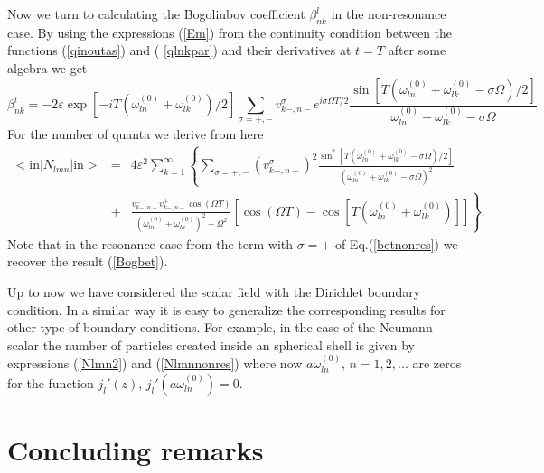 \documentclass[a4paper,11pt]{article}
\begin{document}
Now we turn to calculating the Bogoliubov coefficient $\beta
^{l}_{nk}$ in the non-resonance case. By using the expressions
(\ref{Em})
from the continuity condition between the functions (\ref{qinoutas}) and (%
\ref{qlnkpar}) and their derivatives at $t=T$ after some algebra we get
\begin{equation}
\beta _{nk}^{l} =-2\varepsilon \exp \left[ -iT\left( \omega
_{ln}^{(0)}+\omega _{lk}^{(0)}\right) /2\right] \sum_{\sigma =+,-}
v_{k-,n-}^{\sigma }e^{i\sigma \Omega T/2}\frac{\sin \left[ T\left( \omega
_{ln}^{(0)}+\omega _{lk}^{(0)}-\sigma \Omega \right) /2\right] }{\omega
_{ln}^{(0)}+\omega _{lk}^{(0)}-\sigma \Omega }   \label{betnonres}
\end{equation}
For the number of quanta we derive from here
\begin{eqnarray}
<{\mathrm{in}}|N_{lmn}|{\mathrm{in}}>&=&4\varepsilon ^{2}\sum_{k=1}^{\infty
}\left\{ \sum_{\sigma =+,-}\left( v_{k-,n-}^{\sigma }\right) ^{2}
\frac{\sin ^{2}\left[ T\left(
\omega _{ln}^{(0)}+\omega _{lk}^{(0)}-\sigma \Omega \right) /2\right] }{\left(
\omega _{ln}^{(0)}+\omega _{lk}^{(0)}-\sigma \Omega \right) ^{2}}\right.
\label{Nlmnnonres} \\
&+&\left. \frac{v_{k-,n-}^{-}v_{k-,n-}^{+}\cos (\Omega T)}{\left( \omega
_{ln}^{(0)}+\omega _{lk}^{(0)}\right) ^{2}-\Omega ^{2}}\left[ \cos (\Omega
T)-\cos \left[ T\left( \omega _{ln}^{(0)}+\omega _{lk}^{(0)}\right) \right] %
\right] \right\} .  \nonumber
\end{eqnarray}
Note that in the resonance case from the term with $\sigma =+$
of Eq.(\ref{betnonres}) we
recover the result (\ref{Bogbet}).

Up to now we have considered the scalar field with the Dirichlet
boundary condition. In a similar way it is easy to generalize the
corresponding results for other type of boundary conditions. For
example, in the case of the Neumann scalar the number of particles
created inside an spherical shell is given by expressions
(\ref{Nlmn2}) and (\ref{Nlmnnonres}) where now $a\omega
^{(0)}_{ln}$, $n=1,2,...$ are zeros for the function $j_{l}'(z)$,
$j_{l}'(a\omega ^{(0)}_{ln})=0$.

\section{Concluding remarks}
\end{document}
